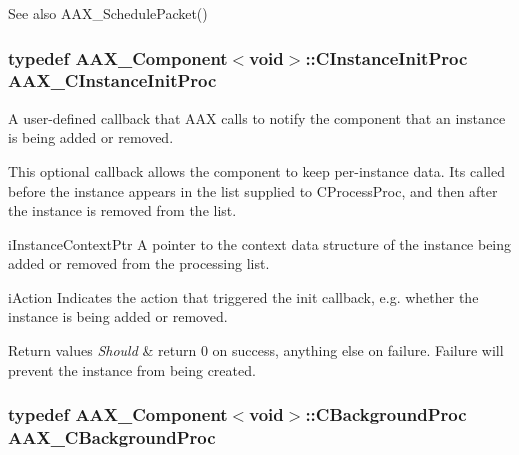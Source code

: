 \begin{DoxySeeAlso}{See also}
A\+A\+X\+\_\+\+Schedule\+Packet() 
\end{DoxySeeAlso}
\hypertarget{a00163_a3963a850079d3186e08c97a1a4d0ef1c}{}
\subsubsection[{A\+A\+X\+\_\+\+C\+Instance\+Init\+Proc}]{\setlength{\rightskip}{0pt plus 5cm}typedef {\bf A\+A\+X\+\_\+\+Component}$<$void$>$\+::C\+Instance\+Init\+Proc {\bf A\+A\+X\+\_\+\+C\+Instance\+Init\+Proc}}\label{a00163_a3963a850079d3186e08c97a1a4d0ef1c}


A user-\/defined callback that A\+A\+X calls to notify the component that an instance is being added or removed. 

This optional callback allows the component to keep per-\/instance data. It\textquotesingle{}s called before the instance appears in the list supplied to C\+Process\+Proc, and then after the instance is removed from the list.

\begin{DoxyParagraph}{i\+Instance\+Context\+Ptr}
A pointer to the context data structure of the instance being added or removed from the processing list.
\end{DoxyParagraph}
\begin{DoxyParagraph}{i\+Action}
Indicates the action that triggered the init callback, e.\+g. whether the instance is being added or removed.
\end{DoxyParagraph}

\begin{DoxyRetVals}{Return values}
{\em Should} & return 0 on success, anything else on failure. Failure will prevent the instance from being created. \\
\hline
\end{DoxyRetVals}
\hypertarget{a00163_aa64561d963284a3124a0821e7dc79c9a}{}
\subsubsection[{A\+A\+X\+\_\+\+C\+Background\+Proc}]{\setlength{\rightskip}{0pt plus 5cm}typedef {\bf A\+A\+X\+\_\+\+Component}$<$void$>$\+::C\+Background\+Proc {\bf A\+A\+X\+\_\+\+C\+Background\+Proc}}\label{a00163_aa64561d963284a3124a0821e7dc79c9a}


